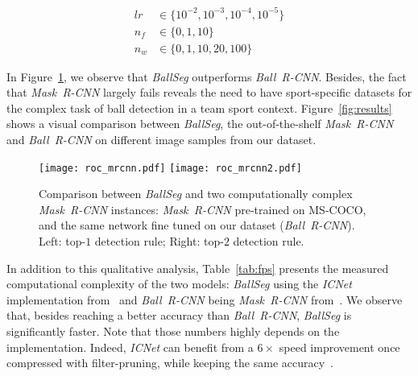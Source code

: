 \documentclass[sigconf, screen]{acmart}
\begin{document}
\begin{align*}
    lr &\in \{10^{-2}, 10^{-3}, 10^{-4}, 10^{-5}\} \\
    n_f &\in \{0, 1, 10\} \\
    n_w &\in \{0, 1, 10, 20, 100\}
\end{align*}

In Figure~\ref{fig:roc_rcnn}, we observe that \emph{BallSeg} outperforms \emph{Ball~R-CNN}. Besides, the fact that \emph{Mask~R-CNN} largely fails reveals the need to have sport-specific datasets for the complex task of ball detection in a team sport context. Figure~\ref{fig:results} shows a visual comparison between \emph{BallSeg}, the out-of-the-shelf \emph{Mask~R-CNN} and \emph{Ball~R-CNN} on different image samples from our dataset.

\begin{figure}
    \begin{center}
    \texttt{[image: roc\_mrcnn.pdf]}\hspace{2em}
    \texttt{[image: roc\_mrcnn2.pdf]}
    \end{center}
    \caption{Comparison between \emph{BallSeg} and two computationally complex \emph{Mask~R-CNN} instances: \emph{Mask~R-CNN} pre-trained on MS-COCO, and the same network fine tuned on our dataset (\emph{Ball~R-CNN}). Left: top-$1$ detection rule; Right: top-$2$ detection rule.}
    \label{fig:roc_rcnn}
\end{figure}


In addition to this qualitative analysis, Table~\ref{tab:fps} presents the measured computational complexity of the two models: \emph{BallSeg} using the \emph{ICNet} implementation from~\cite{hellochick} and \emph{Ball~R-CNN} being \emph{Mask~R-CNN} from~\cite{matterport_maskrcnn_2017}. We observe that, besides reaching a better accuracy than \emph{Ball~R-CNN}, \emph{BallSeg} is significantly faster. Note that those numbers highly depends on the implementation. Indeed, \emph{ICNet} can benefit from a $6\times$ speed improvement once compressed with filter-pruning, while keeping the same accuracy~\cite{icnet_implem,fss,Li2019}.
\end{document}

